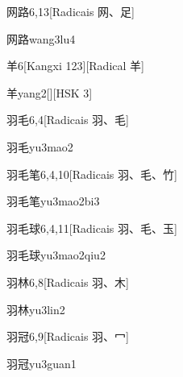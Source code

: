 \begin{entry}{网路}{6,13}[Radicais ⽹、⾜]
  \begin{phonetics}{网路}{wang3lu4}
  \end{phonetics}
\end{entry}

\begin{entry}{羊}{6}[Kangxi 123][Radical ⽺]
  \begin{phonetics}{羊}{yang2}[][HSK 3]
  \end{phonetics}
\end{entry}

\begin{entry}{羽毛}{6,4}[Radicais ⽻、⽑]
  \begin{phonetics}{羽毛}{yu3mao2}
  \end{phonetics}
\end{entry}

\begin{entry}{羽毛笔}{6,4,10}[Radicais ⽻、⽑、⽵]
  \begin{phonetics}{羽毛笔}{yu3mao2bi3}
  \end{phonetics}
\end{entry}

\begin{entry}{羽毛球}{6,4,11}[Radicais ⽻、⽑、⽟]
  \begin{phonetics}{羽毛球}{yu3mao2qiu2}
  \end{phonetics}
\end{entry}

\begin{entry}{羽林}{6,8}[Radicais ⽻、⽊]
  \begin{phonetics}{羽林}{yu3lin2}
  \end{phonetics}
\end{entry}

\begin{entry}{羽冠}{6,9}[Radicais ⽻、⼍]
  \begin{phonetics}{羽冠}{yu3guan1}
  \end{phonetics}
\end{entry}

